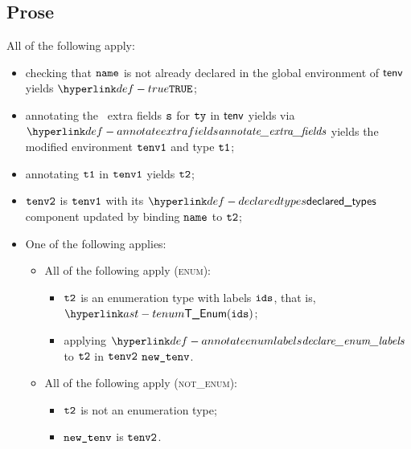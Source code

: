 \subsection{Prose}
All of the following apply:
\begin{itemize}
  \item checking that $\texttt{name}$ is not already declared in the global environment of $\textsf{tenv}$ yields $\True$\ProseOrTypeError;
  \item annotating the \optional\ extra fields $\texttt{s}$ for $\texttt{ty}$ in $\textsf{tenv}$ yields via \\ $\annotateextrafields$
        yields the modified environment $\texttt{tenv1}$ and type $\texttt{t1}$\ProseOrTypeError;
  \item annotating $\texttt{t1}$ in $\texttt{tenv1}$ yields $\texttt{t2}$\ProseOrTypeError;
  \item $\texttt{tenv2}$ is $\texttt{tenv1}$ with its $\declaredtypes$ component updated by binding $\texttt{name}$ to $\texttt{t2}$;
  \item One of the following applies:
  \begin{itemize}
    \item All of the following apply (\textsc{enum}):
    \begin{itemize}
      \item $\texttt{t2}$ is an enumeration type with labels $\texttt{ids}$, that is, $\TEnum(\ids)$;
      \item applying $\declareenumlabels$ to $\texttt{t2}$ in $\texttt{tenv2}$ $\texttt{new\_tenv}$\ProseOrTypeError.
    \end{itemize}

    \item All of the following apply (\textsc{not\_enum}):
    \begin{itemize}
      \item $\texttt{t2}$ is not an enumeration type;
      \item $\texttt{new\_tenv}$ is $\texttt{tenv2}$.
    \end{itemize}
  \end{itemize}
\end{itemize}



